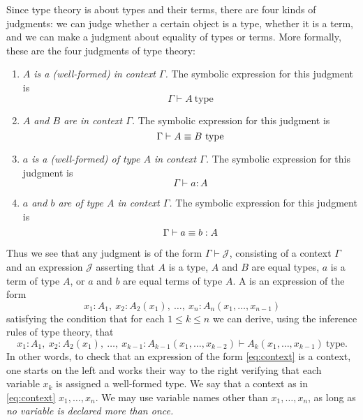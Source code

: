 Since type theory is about types and their terms, there are four kinds of judgments: we can judge whether a certain object is a type, whether it is a term, and we can make a judgment about equality of types or terms. More formally, these are the four judgments of type theory:
\begin{enumerate}
\item \emph{$A$ is a (well-formed)  in context $\Gamma$.} The symbolic expression for this judgment is
  \begin{equation*}
    \Gamma\vdash A~\mathrm{type}
  \end{equation*}
\item \emph{$A$ and $B$ are  in context $\Gamma$.} The symbolic expression for this judgment is
  \begin{equation*}
    \Gamma\vdash A \equiv B~\mathrm{type}
  \end{equation*}
\item \emph{$a$ is a (well-formed)  of type $A$ in context $\Gamma$.} The symbolic expression for this judgment is
  \begin{equation*}
    \Gamma \vdash a:A
  \end{equation*}
\item \emph{$a$ and $b$ are  of type $A$ in context $\Gamma$.} The symbolic expression for this judgment is
  \begin{equation*}
    \Gamma\vdash a\equiv b:A
  \end{equation*}
\end{enumerate}
Thus we see that any judgment is of the form $\Gamma\vdash\mathcal{J}$, consisting of a context $\Gamma$ and an expression $\mathcal{J}$ asserting that $A$ is a type, $A$ and $B$ are equal types, $a$ is a term of type $A$, or $a$ and $b$ are equal terms of type $A$. A  is an expression of the form
\begin{equation}\label{eq:context}
x_1:A_1,~x_2:A_2(x_1),~\ldots,~x_n:A_n(x_1,\ldots,x_{n-1})
\end{equation}
satisfying the condition that for each $1\leq k\leq n$ we can derive, using the inference rules of type theory, that
\begin{equation}\label{eq:context-condition}
  x_1:A_1,~x_2:A_2(x_1),~\ldots,~x_{k-1}:A_{k-1}(x_1,\ldots,x_{k-2})\vdash A_k(x_1,\ldots,x_{k-1})~\mathrm{type}.
\end{equation}
In other words, to check that an expression of the form \cref{eq:context} is a context, one starts on the left and works their way to the right verifying that each variable $x_k$ is assigned a well-formed type. We say that a context as in \cref{eq:context}  $x_1,\ldots,x_n$. We may use variable names other than $x_1,\ldots,x_n$, as long as \emph{no variable is declared more than once.}

